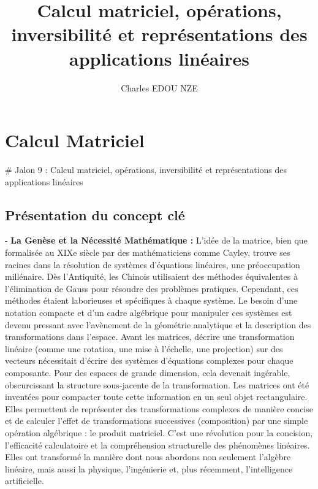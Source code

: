 \documentclass[12pt,a4paper]{report}
\title{Calcul matriciel, opérations, inversibilité et représentations des applications linéaires}
\author{Charles EDOU NZE}
\date{}
\begin{document}
\maketitle
\tableofcontents

\chapter{Calcul Matriciel}

# Jalon 9 : Calcul matriciel, opérations, inversibilité et représentations des applications linéaires

\section{Présentation du concept clé}

-   \textbf{La Genèse et la Nécessité Mathématique :} L'idée de la matrice, bien que formalisée au XIXe siècle par des mathématiciens comme Cayley, trouve ses racines dans la résolution de systèmes d'équations linéaires, une préoccupation millénaire. Dès l'Antiquité, les Chinois utilisaient des méthodes équivalentes à l'élimination de Gauss pour résoudre des problèmes pratiques. Cependant, ces méthodes étaient laborieuses et spécifiques à chaque système. Le besoin d'une notation compacte et d'un cadre algébrique pour manipuler ces systèmes est devenu pressant avec l'avènement de la géométrie analytique et la description des transformations dans l'espace.
    Avant les matrices, décrire une transformation linéaire (comme une rotation, une mise à l'échelle, une projection) sur des vecteurs nécessitait d'écrire des systèmes d'équations complexes pour chaque composante. Pour des espaces de grande dimension, cela devenait ingérable, obscurcissant la structure sous-jacente de la transformation. Les matrices ont été inventées pour compacter toute cette information en un seul objet rectangulaire. Elles permettent de représenter des transformations complexes de manière concise et de calculer l'effet de transformations successives (composition) par une simple opération algébrique : le produit matriciel. C'est une révolution pour la concision, l'efficacité calculatoire et la compréhension structurelle des phénomènes linéaires. Elles ont transformé la manière dont nous abordons non seulement l'algèbre linéaire, mais aussi la physique, l'ingénierie et, plus récemment, l'intelligence artificielle.
\end{document}

